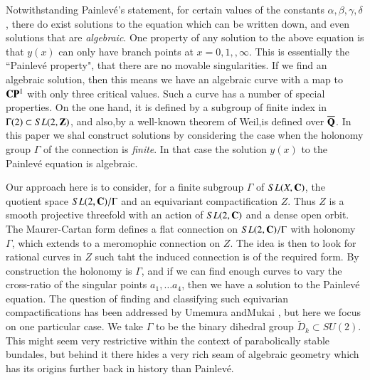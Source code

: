 Notwithstanding Painlev\'e's statement, for certain values of the constants $\alpha, \beta, \gamma, \delta$, there do exist solutions to the equation which can be written down, and even solutions that are \textit{algebraic}. One property of any solution to the above equation is that $y(x)$ can only have branch points at $x = 0,1,, \infty$. This is essentially the ``Painlev\'e property", that there are no movable singularities. If we find an algebraic solution, then this means we have an algebraic curve with a map to $\mathbf{C}\mathbf{P}^{1}$ with only three critical values. Such a curve has a number of special properties. On the one hand, it is defined by a subgroup of finite index in $\Gamma(2) \subset SL(2, \mathbf{Z})$, and also,by a well-known theorem of Weil,is defined over $\overline{\mathbf{Q}}$. In this paper we shal construct solutions by considering the case when the holonomy group $\Gamma$ of the connection is \textit{finite}. In that case the solution $y(x)$ to the Painlev\'e equation is algebraic.

\newpage

Our approach here is to consider, for a finite subgroup $\Gamma$ of $SL(X, \mathbf{C})$, the quotient space $SL(2 ,\mathbf{C})/\Gamma$ and an equivariant compactification $Z$. Thus $Z$ is a smooth projective threefold with an action of $SL(2, \mathbf{C})$ and a dense open orbit. The Maurer-Cartan form defines a flat connection on $SL(2, \mathbf{C})/\Gamma$ with holonomy $\Gamma$, which extends to a meromophic connection on $Z$. The idea is then to look for rational curves in $Z$ such taht the induced connection is of the required form. By construction the holonomy is $\Gamma$, and if we can find enough curves to vary the cross-ratio of the singular points $a_{1}, \ldots a_{4}$, then we have a solution to the Painlev\'e equation. The question of finding and classifying such equivarian compactifications has been addressed by Umemura and\pageoriginale Mukai \cite{chap7-key12}, but here we focus on one particular case. We take $\Gamma$ to be the binary dihedral group $\tilde{D}_{k} \subset SU(2)$. This might seem very restrictive within the context of parabolically stable bundales, but behind it there hides a very rich seam of algebraic geometry which has its origins further back in history than Painlev\'e.

